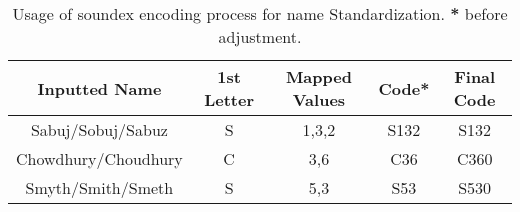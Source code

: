 \begin{table}[!h]
    \centering
    \caption{Usage of soundex encoding process for name Standardization. \textbf{*} before adjustment.}
    \label{tab:soundex}
    \setlength{\tabcolsep}{2pt}
    \begin{tabular}{c|cccc}
    \toprule
         \textbf{Inputted Name }&\textbf{1st Lette}r &\textbf{Mapped Values} & \textbf{Code*}  &\textbf{Final Code}  \\
         \midrule
         Sabuj/Sobuj/Sabuz &S &1,3,2 &S132 &S132\\
         Chowdhury/Choudhury & C &3,6 &C36 &C360\\
         Smyth/Smith/Smeth &S &5,3 &S53 &S530\\
         \bottomrule
    \end{tabular}
\end{table}


